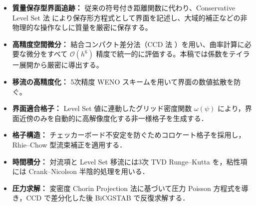 \documentclass[12pt, a4paper, titlepage, xelatex, ja=standard]{bxjsarticle}
\newcommand{\Ord}[1]{\mathcal{O}(#1)}
\begin{document}
\begin{itemize}
  \item \textbf{質量保存型界面追跡：} 従来の符号付き距離関数に代わり、Conservative Level Set 法 \cite{OlssonKreiss2005} により保存形方程式として界面を記述し、大域的補正などの非物理的な操作なしに質量を厳密に保存する。
  \item \textbf{高精度空間微分：} 結合コンパクト差分法（CCD 法 \cite{ChuFan1998}）を用い、曲率計算に必要な微分をすべて $\Ord{h^6}$ 精度で統一的に評価する。本稿では係数をテイラー展開から厳密に導出する。
  \item \textbf{移流の高精度化：} 5次精度 WENO スキームを用いて界面の数値拡散を防ぐ。
  \item \textbf{界面適合格子：} Level Set 値に連動したグリッド密度関数 $\omega(\psi)$ により，界面近傍のみを自動的に高解像度化する非一様格子を生成する．
  \item \textbf{格子構造：} チェッカーボード不安定を防ぐためコロケート格子を採用し，Rhie--Chow 型流束補正を適用する．
  \item \textbf{時間積分：} 対流項と Level Set 移流には3次 TVD Runge--Kutta を，粘性項には Crank--Nicolson 半陰的処理を用いる．
  \item \textbf{圧力求解：} 変密度 Chorin Projection 法に基づいて圧力 Poisson 方程式を導き，CCD で差分化した後 BiCGSTAB で反復求解する．
\end{itemize}
\end{document}
